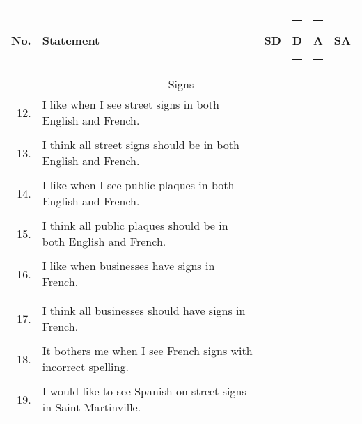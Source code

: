     \begin{longtable}[c]{| r p{} | c | c | c | c |}
      \hline
      No. & Statement                                                                 & SD & \rule{2.5pt}{0pt}D\rule{2.5pt}{0pt} & \rule{2.5pt}{0pt}A\rule{2.5pt}{0pt} & SA \\
      \hline
      \multicolumn{6}{c}{Signs} \\
      \hline
      12. & I like when I see street signs in both English and French.                & & & & \\
          &                                                                           & & & & \\
      \hline
      13. & I think all street signs should be in both English and French.            & & & & \\
          &                                                                           & & & & \\
      \hline
      14. & I like when I see public plaques in both English and French.              & & & & \\
          &                                                                           & & & & \\
      \hline
      15. & I think all public plaques should be in both English and French.          & & & & \\
          &                                                                           & & & & \\
      \hline
      16. & I like when businesses have signs in French.                              & & & & \\
          &                                                                           & & & & \\
              &                                                                           & & & & \\
      \hline
      17. & I think all businesses should have signs in French.                       & & & & \\
          &                                                                           & & & & \\
      \hline
      18. & It bothers me when I see French signs with incorrect spelling.            & & & & \\
          &                                                                           & & & & \\
      \hline
      19. & I would like to see Spanish on street signs in Saint Martinville.         & & & & \\

\end{longtable}
